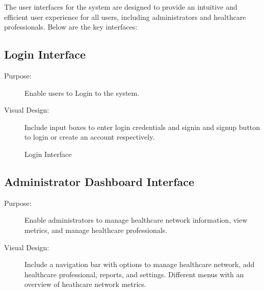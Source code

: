 \documentclass[12pt, titlepage]{article}
\begin{document}
The user interfaces for the system are designed to provide an intuitive and efficient user experience for all users, including administrators and healthcare professionals. Below are the key interfaces:


\subsection{Login Interface}
\begin{description}
    \item[Purpose:]Enable users to Login to the system.
   
    \item[Visual Design:]Include input boxes to enter login credentials and signin and signup button to login or create an account respectively.
\end{description}

\begin{figure}[h!]
    \centering
    \caption{Login Interface}
    \label{fig:admin-interface}
\end{figure}

\newpage{}


\subsection{Administrator Dashboard Interface}
\begin{description}
    \item[Purpose:]Enable administrators to manage healthcare network information, view metrics, and manage healthcare professionals.
   
    \item[Visual Design:]Include a navigation bar with options to manage healthcare network, add healthcare professional, reports, and settings. Different menus with an overview of heathcare network metrics.
\end{description}
\end{document}
